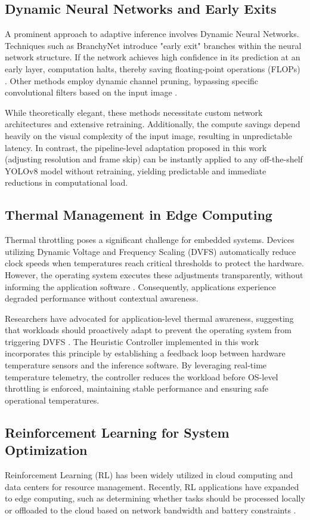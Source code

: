 \documentclass{ieeeaccess}
\begin{document}
\subsection{Dynamic Neural Networks and Early Exits}
A prominent approach to adaptive inference involves Dynamic Neural Networks. Techniques such as BranchyNet introduce "early exit" branches within the neural network structure. If the network achieves high confidence in its prediction at an early layer, computation halts, thereby saving floating-point operations (FLOPs) \cite{b3}. Other methods employ dynamic channel pruning, bypassing specific convolutional filters based on the input image \cite{b4}.

While theoretically elegant, these methods necessitate custom network architectures and extensive retraining. Additionally, the compute savings depend heavily on the visual complexity of the input image, resulting in unpredictable latency. In contrast, the pipeline-level adaptation proposed in this work (adjusting resolution and frame skip) can be instantly applied to any off-the-shelf YOLOv8 model without retraining, yielding predictable and immediate reductions in computational load.

\subsection{Thermal Management in Edge Computing}
Thermal throttling poses a significant challenge for embedded systems. Devices utilizing Dynamic Voltage and Frequency Scaling (DVFS) automatically reduce clock speeds when temperatures reach critical thresholds to protect the hardware. However, the operating system executes these adjustments transparently, without informing the application software \cite{b5}. Consequently, applications experience degraded performance without contextual awareness.

Researchers have advocated for application-level thermal awareness, suggesting that workloads should proactively adapt to prevent the operating system from triggering DVFS \cite{b6}. The Heuristic Controller implemented in this work incorporates this principle by establishing a feedback loop between hardware temperature sensors and the inference software. By leveraging real-time temperature telemetry, the controller reduces the workload before OS-level throttling is enforced, maintaining stable performance and ensuring safe operational temperatures.

\subsection{Reinforcement Learning for System Optimization}
Reinforcement Learning (RL) has been widely utilized in cloud computing and data centers for resource management. Recently, RL applications have expanded to edge computing, such as determining whether tasks should be processed locally or offloaded to the cloud based on network bandwidth and battery constraints \cite{b7}.
\end{document}
